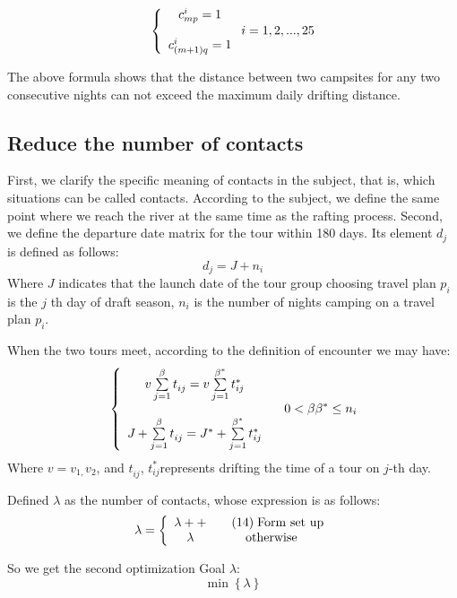 	\begin{equation}
	\left\{ {\begin{array}{*{20}{c}}
		{c_{mp}^i = 1}\\
		\\
		{c_{(m + 1)q}^i = 1}
		\end{array}} \right.{\rm{        }}i = 1,2,...,25\label{aa1}
	\end{equation}
	\par The above formula shows that the distance between two campsites for any two consecutive nights can not exceed the maximum daily drifting distance.

\subsection{Reduce the number of contacts}
\label{subsection:5.2subsection}
First, we clarify the specific meaning of contacts in the subject, that is, which situations can be called contacts. According to the subject, we define the same point where we reach the river at the same time as the rafting process. Second, we define the departure date matrix for the tour within 180 days. Its element $d_j^{}$ is defined as follows: 
	\begin{equation}
	{d_j} = J + {n_i}\label{aa1}
	\end{equation}
	Where $J$ indicates that the launch date of the tour group choosing travel plan ${p_i}$ is the $j$ th day of draft season, ${n_i}$ is the number of nights camping on a travel plan ${p_i}$.
	\par When the two tours meet, according to the definition of encounter we may have:
	\begin{equation}
	{\rm{   }}\left\{ {\begin{array}{*{20}{c}}
		{v\sum\limits_{j = 1}^\beta  {t_{ij}^{} = v\sum\limits_{j = 1}^{{\beta ^ * }} {t_{ij}^ * } } }&{}\\
		\\
		{{J_{}} + \sum\limits_{j = 1}^\beta  {t_{ij}^{}}  = {J^ * } + \sum\limits_{j = 1}^{{\beta ^ * }} {t_{ij}^ * } }&{}
		\end{array}} \right.0 < \beta {\beta ^ * } \le {n_i}\label{aa1}
	\end{equation}
	Where $v = {v_{1,}}{v_2}$, and $t_{ij}^{}$, $t_{ij}^ * $represents drifting the time of a tour on $j$-th day.
	\par Defined $\lambda $ as the number of contacts, whose expression is as follows:
	\begin{equation}
	\lambda  = \left\{ {\begin{array}{*{20}{c}}
		{\lambda  +  + }&{{\rm{  \quad    (14)\; Form\ set\ up}}}\\
		\lambda &{{\rm{otherwise}}}
		\end{array}} \right.\label{aa1}
	\end{equation}
	\par So we get the second optimization Goal $\lambda $:
	\begin{equation}
	\min \left\{ \lambda  \right\}\label{aa1}
	\end{equation}
	
